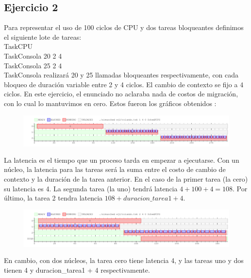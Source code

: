 \subsection{Ejercicio 2}

Para representar el uso de 100 ciclos de CPU y dos tareas bloqueantes definimos el siguiente lote de tareas:\\

TaskCPU \\
TaskConsola 20 2 4\\
TaskConsola 25 2 4\\

TaskConsola realizará 20 y 25 llamadas bloqueantes respectivamente, con cada bloqueo de duración variable entre 2 y 4 ciclos. El cambio de contexto se fijo a 4 ciclos. En este ejercicio, el enunciado no aclaraba nada de costos de migración, con lo cual lo mantuvimos en cero. Estos fueron los gráficos obtenidos :



\begin{figure}[h]
  \includegraphics[width=\textwidth]{../ej2/uncore.png}
  \caption{}
\end{figure}

La latencia es el tiempo que un proceso tarda en empezar a ejecutarse. Con un núcleo, la latencia para las tareas será la suma entre el costo de cambio de contexto y la duración de la tarea anterior. En el caso de la primer tarea (la cero) su latencia es 4. La segunda tarea (la uno) tendrá latencia $ 4 + 100 + 4 = 108$. Por último, la tarea 2 tendra latencia $ 108 + duracion\_tarea1 + 4$.



\begin{figure}[h]
  \includegraphics[width=\textwidth]{../ej2/doscores.png}
  \caption{}
\end{figure}

En cambio, con dos núcleos, la tarea cero tiene latencia 4, y las tareas uno y dos tienen 4 y duracion\_tarea1 + 4 respectivamente.

